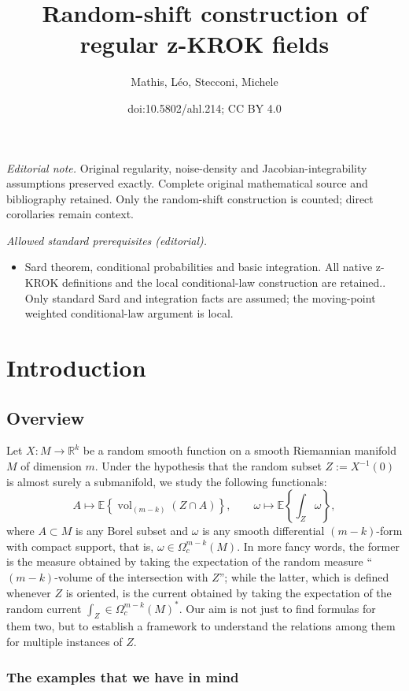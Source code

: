 \documentclass[10pt]{amsart}
\title{Random-shift construction of regular z-KROK fields}
\author{Mathis, Léo, Stecconi, Michele}
\date{doi:10.5802/ahl.214; CC BY 4.0}
\theoremstyle{definition}\newtheorem{defi}[theo]{Definition}\newtheorem{rema}[theo]{Remark}\newtheorem{exam}[theo]{Example}\newtheorem{exem}[theo]{Example}\newtheorem{nota}[theo]{Notation}
\newcommand{\R}{\mathbb{R}}
\newcommand{\EE}{\mathbb{E}}
\DeclareMathOperator{\vol}{vol}
\begin{document}
\maketitle
\noindent\textit{Editorial note.} Original regularity, noise-density and Jacobian-integrability assumptions preserved exactly. Complete original mathematical source and bibliography retained. Only the random-shift construction is counted; direct corollaries remain context.\par\medskip
\noindent\textit{Allowed standard prerequisites (editorial).}\begin{itemize}
\item Sard theorem, conditional probabilities and basic integration. All native z-KROK definitions and the local conditional-law construction are retained.. Only standard Sard and integration facts are assumed; the moving-point weighted conditional-law argument is local.
\end{itemize}\medskip

\section{Introduction}\label{sec:intro}
\subsection{Overview}

Let $X\colon M\to \R^k$ be a random smooth function on a smooth Riemannian manifold $M$ of dimension $m$. Under the hypothesis that the random subset $Z:=X^{-1}(0)$ is almost surely a submanifold, we study the following functionals:
\begin{equation}\label{eq:rhoalpha1}
A\mapsto\EE\left\{\vol_{(m-k)}(Z\cap A)\right\}, \qquad \omega\mapsto \EE\left\{\int_{Z} \omega\right\},
\end{equation}
where $A\subset M$ is any Borel subset and $\omega$ is any smooth differential $(m-k)$-form with compact support, that is, $\omega\in \Omega_c^{m-k}(M)$. In more fancy words, the former is the measure obtained by taking the expectation of the random measure ``$(m-k)$-volume of the intersection with $Z$''; while the latter, which is defined whenever $Z$ is oriented, is the current obtained by taking the expectation of the random current $\int_Z\in \Omega_c^{m-k}(M)^*$. Our aim is not just to find formulas for them two, but to establish a framework to understand the relations among them for multiple instances of $Z$.

\subsubsection{The examples that we have in mind}\label{subsub:exmind}
\end{document}
